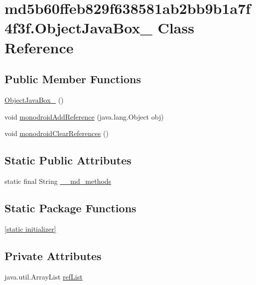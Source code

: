 \hypertarget{classmd5b60ffeb829f638581ab2bb9b1a7f4f3f_1_1_object_java_box__1}{
\section{md5b60ffeb829f638581ab2bb9b1a7f4f3f.ObjectJavaBox\_ Class Reference}
\label{classmd5b60ffeb829f638581ab2bb9b1a7f4f3f_1_1_object_java_box__1}
}
\subsection*{Public Member Functions}
\begin{CompactItemize}
\item 
\hyperlink{classmd5b60ffeb829f638581ab2bb9b1a7f4f3f_1_1_object_java_box__1_57684979c974a408686b7c4e138a2603}{ObjectJavaBox\_} ()
\item 
void \hyperlink{classmd5b60ffeb829f638581ab2bb9b1a7f4f3f_1_1_object_java_box__1_f2bae9bb53179373bfbbef8b7fa568b1}{monodroidAddReference} (java.lang.Object obj)
\item 
void \hyperlink{classmd5b60ffeb829f638581ab2bb9b1a7f4f3f_1_1_object_java_box__1_4218e4072c05c7d03d73208e68933721}{monodroidClearReferences} ()
\end{CompactItemize}
\subsection*{Static Public Attributes}
\begin{CompactItemize}
\item 
static final String \hyperlink{classmd5b60ffeb829f638581ab2bb9b1a7f4f3f_1_1_object_java_box__1_71c23a08d05ad66171fa5a28f857587d}{\_\-\_\-md\_\-methods}
\end{CompactItemize}
\subsection*{Static Package Functions}
\begin{CompactItemize}
\item 
\hyperlink{classmd5b60ffeb829f638581ab2bb9b1a7f4f3f_1_1_object_java_box__1_43e3a95536ce83663421831707996996}{\mbox{[}static initializer\mbox{]}}
\end{CompactItemize}
\subsection*{Private Attributes}
\begin{CompactItemize}
\item 
java.util.ArrayList \hyperlink{classmd5b60ffeb829f638581ab2bb9b1a7f4f3f_1_1_object_java_box__1_2b744b25a4e0536e5ab583cdd3eefe36}{refList}
\end{CompactItemize}


